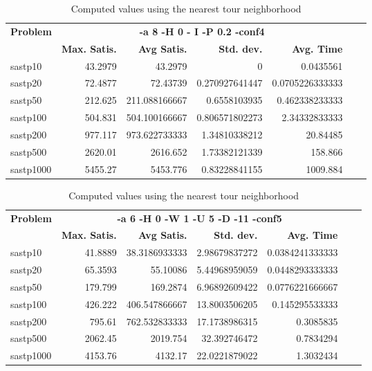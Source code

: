 \documentclass{article}
\begin{document}
\begin{table}[b!]
  \vspace{-6mm}%
  \caption{Computed values using the nearest tour neighborhood}
  \label{tab:NearestTour}
  \setlength{\tabcolsep}{1.4mm}
  \centering
  \begin{tabular}{lrrrrrr}
   \multirow{2}{*}{\bfseries Problem} &
      \multicolumn{4}{c}{\bfseries -a 8 -H 0 - I -P 0.2 -conf4 } \\
    &
    \bfseries Max. Satis. &
    \bfseries Avg Satis. &
    \bfseries Std. dev. &
    \bfseries Avg. Time 
    \\\hline
sastp10 & 43.2979 & 43.2979 & 0 & 0.0435561 \\ 
sastp20 & 72.4877 & 72.43739 & 0.270927641447 & 0.0705226333333 \\ 
sastp50 & 212.625 & 211.088166667 & 0.6558103935 & 0.462338233333 \\ 
sastp100 & 504.831 & 504.100166667 & 0.806571802273 & 2.34332833333 \\ 
sastp200 & 977.117 & 973.622733333 & 1.34810338212 & 20.84485 \\ 
sastp500 & 2620.01 & 2616.652 & 1.73382121339 & 158.866 \\ 
sastp1000 & 5455.27 & 5453.776 & 0.83228841155 & 1009.884

    \\\hline
  \end{tabular}

\end{table}


\begin{table}[b!]
  \vspace{-6mm}%
  \caption{Computed values using the nearest tour neighborhood}
  \label{tab:NearestTour}
  \setlength{\tabcolsep}{1.4mm}
  \centering
  \begin{tabular}{lrrrrrr}
   \multirow{2}{*}{\bfseries Problem} &
      \multicolumn{4}{c}{\bfseries -a 6 -H 0 -W 1 -U 5 -D -11 -conf5 } \\
    &
    \bfseries Max. Satis. &
    \bfseries Avg Satis. &
    \bfseries Std. dev. &
    \bfseries Avg. Time 
    \\\hline
    sastp10 & 41.8889 & 38.3186933333 & 2.98679837272 & 0.0384241333333 \\ 
sastp20 & 65.3593 & 55.10086 & 5.44968959059 & 0.0448293333333 \\ 
sastp50 & 179.799 & 169.2874 & 6.96892609422 & 0.0776221666667 \\ 
sastp100 & 426.222 & 406.547866667 & 13.8003506205 & 0.145295533333 \\ 
sastp200 & 795.61 & 762.532833333 & 17.1738986315 & 0.3085835 \\ 
sastp500 & 2062.45 & 2019.754 & 32.392746472 & 0.7834294 \\ 
sastp1000 & 4153.76 & 4132.17 & 22.0221879022 & 1.3032434
    \\\hline
  \end{tabular}

\end{table}
\end{document}
